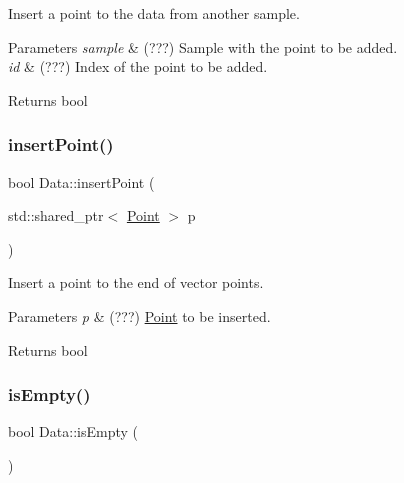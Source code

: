 Insert a point to the data from another sample. 


\begin{DoxyParams}{Parameters}
{\em sample} & (???) Sample with the point to be added. \\
\hline
{\em id} & (???) Index of the point to be added. \\
\hline
\end{DoxyParams}
\begin{DoxyReturn}{Returns}
bool 
\end{DoxyReturn}
\mbox{\label{class_data_a4dcec7d15085d451cf46a0459fab9f46}} 
\subsubsection{\texorpdfstring{insert\+Point()}{insertPoint()}\hspace{0.1cm}{\footnotesize\ttfamily [2/2]}}
{\footnotesize\ttfamily bool Data\+::insert\+Point (\begin{DoxyParamCaption}\item[{std\+::shared\+\_\+ptr$<$ \hyperlink{class_point}{Point} $>$}]{p }\end{DoxyParamCaption})}



Insert a point to the end of vector points. 


\begin{DoxyParams}{Parameters}
{\em p} & (???) \hyperlink{class_point}{Point} to be inserted. \\
\hline
\end{DoxyParams}
\begin{DoxyReturn}{Returns}
bool 
\end{DoxyReturn}
\mbox{\label{class_data_a93468d3b8b2ce0f73e369e5de160534e}} 
\subsubsection{\texorpdfstring{is\+Empty()}{isEmpty()}}
{\footnotesize\ttfamily bool Data\+::is\+Empty (\begin{DoxyParamCaption}{ }\end{DoxyParamCaption})}



